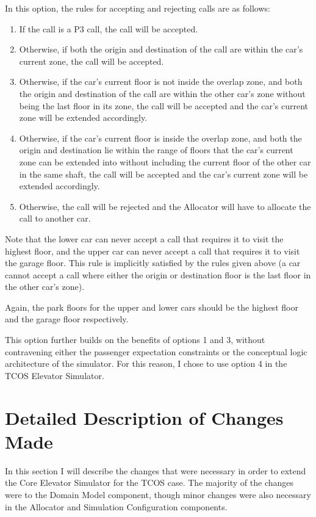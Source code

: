 \documentclass{UoYCSproject}
\begin{document}
In this option, the rules for accepting and rejecting calls are as follows:
	\begin{enumerate}
		\item If the call is a P3 call, the call will be accepted.
		\item Otherwise, if both the origin and destination of the call are within the car's current zone, the call will be accepted.
		\item Otherwise, if the car's current floor is not inside the overlap zone, and both the origin and destination of the call are within the other car's zone without being the last floor in its zone, the call will be accepted and the car's current zone will be extended accordingly.
		\item Otherwise, if the car's current floor is inside the overlap zone, and both the origin and destination lie within the range of floors that the car's current zone can be extended into without including the current floor of the other car in the same shaft, the call will be accepted and the car's current zone will be extended accordingly.
		\item Otherwise, the call will be rejected and the Allocator will have to allocate the call to another car.
	\end{enumerate}

Note that the lower car can never accept a call that requires it to visit the highest floor, and the upper car can never accept a call that requires it to visit the garage floor.  This rule is implicitly satisfied by the rules given above (a car cannot accept a call where either the origin or destination floor is the last floor in the other car's zone).

Again, the park floors for the upper and lower cars should be the highest floor and the garage floor respectively.

This option further builds on the benefits of options 1 and 3, without contravening either the passenger expectation constraints or the conceptual logic architecture of the simulator.  For this reason, I chose to use option 4 in the TCOS Elevator Simulator.

\section{Detailed Description of Changes Made}

In this section I will describe the changes that were necessary in order to extend the Core Elevator Simulator for the TCOS case.  The majority of the changes were to the Domain Model component, though minor changes were also necessary in the Allocator and Simulation Configuration components.
\end{document}
